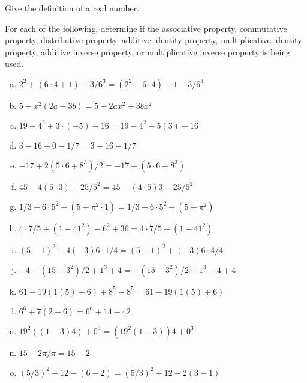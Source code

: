 \documentclass[11pt,letterpaper]{article}
\begin{document}

 Give the definition of a real number. 



\vfill



 For each of the following, determine if the associative property, commutative property, distributive property, additive identity property, multiplicative identity property, additive inverse property, or multiplicative inverse property is being used. \pvspace{0.2cm}

\begin{enumerate}[(a)] \itemsep=2ex
        \item \uans{6cm} \qquad $2^2 + (6 \cdot 4 + 1) - 3/6^3 = (2^2 + 6 \cdot 4) + 1 - 3/6^3$
        \item \uans{6cm} \qquad $5 - x^2 (2a - 3b) = 5- 2ax^2 + 3bx^2$
        \item \uans{6cm} \qquad $19 - 4^2 + 3 \cdot (-5) - 16 = 19 - 4^2 - 5 (3) - 16$
        \item \uans{6cm} \qquad $3 - 16 + 0 -1/7 = 3 - 16 - 1/7$
        \item \uans{6cm} \qquad $-17 + 2(5 \cdot 6 + 8^3)/2 = -17 + (5 \cdot 6 + 8^3)$
        \item \uans{6cm} \qquad $45 - 4(5 \cdot 3) - 25/5^2 = 45 - (4 \cdot 5)3 - 25/5^2$
        \item \uans{6cm} \qquad $1/3 - 6 \cdot 5^2 - (5 + \pi^2 \cdot 1) = 1/3 - 6 \cdot 5^2 - (5 + \pi^2)$
        \item \uans{6cm} \qquad $4 \cdot 7/5 + (1 - 41^2) - 6^2 + 36 = 4 \cdot 7/5 + (1 - 41^2)$
        \item \uans{6cm} \qquad $(5 - 1)^2 + 4(-3)6 \cdot 1/4 = (5 - 1)^2 + (-3)6 \cdot 4/4$
        \item \uans{6cm} \qquad $-4 - (15 - 3^2)/2 + 1^3 + 4 = - (15 - 3^2)/2 + 1^3 - 4 + 4$
        \item \uans{6cm} \qquad $61 - 19( 1(5) + 6) + 8^5 - 8^5 = 61 - 19( 1(5) + 6)$
        \item \uans{6cm} \qquad $6^6 + 7(2 - 6) = 6^6 + 14 - 42$
        \item \uans{6cm} \qquad $19^2 ((1 - 3)4) + 0^3 = (19^2 (1 - 3))4 + 0^3$
        \item \uans{6cm} \qquad $15 - 2\pi/\pi = 15 - 2$
        \item \uans{6cm} \qquad $(5/3)^2 + 12 - (6 - 2) = (5/3)^2 + 12 - 2(3 - 1)$
        \end{enumerate}
\end{document}

